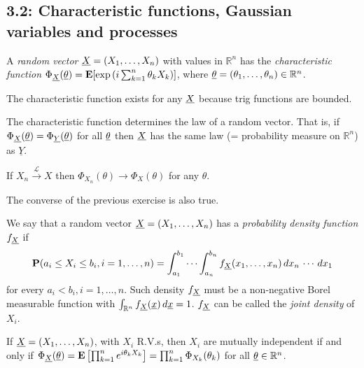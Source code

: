 
\subsection*{3.2: Characteristic functions, Gaussian variables and processes}
\begin{definition*}
A \emph{random vector} ${\underline{X}} = (X_1,\dots,X_n)$ with values in $\mathbb R^n$ has the \emph{characteristic function} 
$\Phi_{{\underline{X}}}(\underline{\theta}) = \mathbf{E}[\exp{(i \sum_{k=1}^n \theta_k X_k)}]$, 
where $\underline{\theta} = (\theta_1,\dots,\theta_n) \in \mathbb R^n$.
\end{definition*}

\begin{remark*}
The characteristic function exists for any ${\underline{X}}$ because trig functions are bounded.
\end{remark*}

\begin{proposition*}
The characteristic function determines the law of a random vector. That is, if $\Phi_{\underline{X}}(\underline{\theta}) = \Phi_{\underline{Y}}(\underline{\theta})$ for all $\underline{\theta}$ then ${\underline{X}}$ has the same law (= probability measure on $\mathbb R^n$) as $\underline Y$.
\end{proposition*}

\begin{exercise*}
If $X_n \overset{\mathcal L}{\to} X$ then $\Phi_{X_n}(\theta) \to \Phi_X(\theta)$ for any $\theta$.
\end{exercise*}

\begin{remark*}
The converse of the previous exercise is also true.
\end{remark*}

\begin{definition*}
We say that a random vector ${\underline{X}} = (X_1,\dots,X_n)$ has a \emph{probability density function} $f_{\underline{X}}$ if 
\[
	\mathbf P(a_i \leq X_i \leq b_i,i=1,\dots,n) = \int_{a_1}^{b_1} \cdots \int_{a_n}^{b_n} f_{\underline{X}}(x_1,\dots,x_n)\,dx_n\,\cdots\,dx_1
\]
for every $a_i<b_i,i=1,\dots,n$. Such density $f_{\underline{X}}$ must be a non-negative Borel measurable function with $\int_{\mathbb R^n} f_{\underline{X}}(\underline x) \, d\underline x = 1$. $f_{\underline{X}}$ can be called the \emph{joint density} of $X_i$.
\end{definition*}

\begin{proposition*}
If ${\underline{X}} = (X_1,\dots,X_n)$, with $X_i$ R.V.s, then $X_i$ are mutually independent if and only if $\Phi_{\underline{X}}(\underline{\theta}) = \mathbf{E} \left[ \prod_{k=1}^n e^{i\theta_kX_k}\right] = \prod_{k=1}^n \Phi_{X_k}(\theta_k)$ for all $\underline{\theta} \in \mathbb R^n$.
\end{proposition*}

